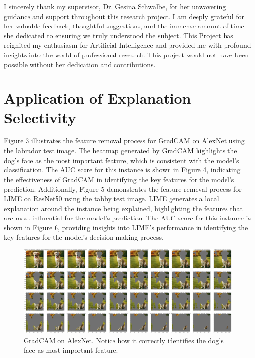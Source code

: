 \documentclass{article}
\begin{document}
I sincerely thank my supervisor, Dr. Gesina Schwalbe, for her unwavering guidance and support throughout this research project. I am deeply grateful for her valuable feedback, thoughtful suggestions, and the immense amount of time she dedicated to ensuring we truly understood the subject. This Project has reignited my enthusiasm for Artificial Intelligence and provided me with profound insights into the world of professional research. This project would not have been possible without her dedication and contributions.

\section*{Application of Explanation Selectivity}

Figure 3 illustrates the feature removal process for GradCAM on AlexNet using the labrador test image. The heatmap generated by GradCAM highlights the dog’s face as the most important feature, which is consistent with the model’s classification. The AUC score for this instance is shown in Figure 4, indicating the effectiveness of GradCAM in identifying the key features for the model’s prediction. Additionally, Figure 5 demonstrates the feature removal process for LIME on ResNet50 using the tabby test image. LIME generates a local explanation around the instance being explained, highlighting the features that are most influential for the model’s prediction. The AUC score for this instance is shown in Figure 6, providing insights into LIME’s performance in identifying the key features for the model’s decision-making process.

\begin{figure}
    \centering
    \includegraphics[width=1\linewidth]{results/gradcam-labrador-feature-removal.png}
    \caption{GradCAM on AlexNet. Notice how it correctly identifies the dog's face as most important feature.}
    \label{fig:gradcam-labrador-feature-removal}
\end{figure}
\end{document}
